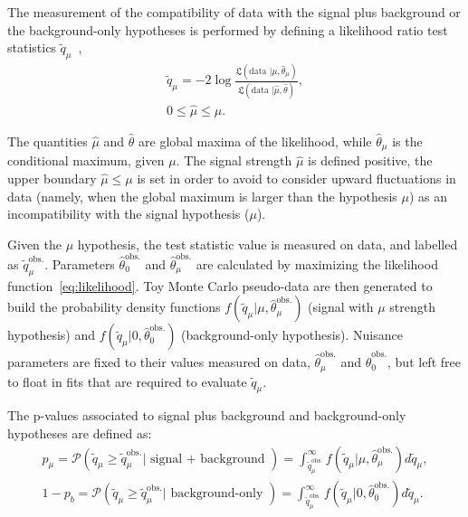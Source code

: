 \noindent The measurement of the compatibility of data with the signal plus background or the background-only hypotheses is performed by defining a likelihood ratio test statistics $\tilde{q}_{\mu}$~\cite{bib:Asymptotic},
\begin{equation}
\begin{gathered}
\tilde{q}_{\mu} = -2 \log { \frac{\mathfrak{L} (\text{data }| \mu, \hat{\theta}_{\mu}) }{ \mathfrak{L} (\text{data }| \hat{\mu}, \hat{\theta})  } },\\
0 \leq \hat{\mu} \leq \mu.
\end{gathered}
\end{equation}

\noindent The quantities $\hat{\mu}$ and $\hat{\theta}$ are global maxima of the likelihood, while $\hat{\theta}_{\mu}$ is the conditional maximum, given $\mu$. The signal strength $\hat{\mu}$ is defined positive, the upper boundary $\hat{\mu} \leq \mu$ is set in order to avoid to consider upward fluctuations in data (namely, when the global maximum is larger than the hypothesis $\mu$) as an incompatibility with the signal hypothesis ($\mu$).

\noindent Given the $\mu$ hypothesis, the test statistic value is measured on data, and labelled as $\tilde{q}_{\mu}^{\text{obs.}}$. Parameters $\hat{\theta}_0^{\text{obs.}}$ and $\hat{\theta}_{\mu}^{\text{obs.}}$ are calculated by maximizing the likelihood function~\ref{eq:likelihood}. Toy Monte Carlo pseudo-data are then generated to build the probability density functions $f(\tilde{q}_{\mu}|\mu, \hat{\theta}_{\mu}^{\text{obs.}})$ (signal with $\mu$ strength hypothesis) and $f(\tilde{q}_{\mu}|0, \hat{\theta}_0^{\text{obs.}})$ (background-only hypothesis). Nuisance parameters are fixed to their values measured on data, $\hat{\theta}_{\mu}^{\text{obs.}}$ and $\hat{\theta}_0^{\text{obs.}}$, but left free to float in fits that are required to evaluate $\tilde{q}_{\mu}$.

\noindent The p-values associated to signal plus background and background-only hypotheses are defined as:
\begin{equation}
\begin{gathered}
p_{\mu} = \mathcal{P} \left( \tilde{q}_{\mu} \geq \tilde{q}_{\mu}^{\text{obs.}} | \text{ signal + background } \right) = \int_{\tilde{q}_{\mu}^{\text{obs.}}}^{\infty} f(\tilde{q}_{\mu}|\mu, \hat{\theta}_{\mu}^{\text{obs.}}) d \tilde{q}_{\mu} ,\\
1 - p_b = \mathcal{P} \left( \tilde{q}_{\mu} \geq \tilde{q}_{\mu}^{\text{obs.}} | \text{ background-only } \right) = \int_{\tilde{q}_{\mu}^{\text{obs.}}}^{\infty} f(\tilde{q}_{\mu}|0, \hat{\theta}_{0}^{\text{obs.}}) d \tilde{q}_{\mu} .\\
\end{gathered}
\end{equation}

